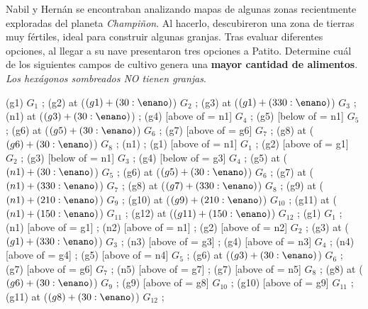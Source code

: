 \begin{probgrupal}{}{}{}

Nabil y Hernán se encontraban analizando mapas de algunas zonas recientmente exploradas del planeta \emph{Champiñon}. Al hacerlo, descubireron una zona %
de tierras muy fértiles, ideal para construir algunas granjas. Tras evaluar diferentes opciones, al llegar a su nave presentaron tres opciones a Patito. %
Determine cuál de los siguientes campos de cultivo genera una \textbf{mayor cantidad de alimentos}. \emph{Los hexágonos sombreados NO tienen granjas}.

\begin{center}
\cultivosP
\granja (g1) {$G_1$} ;
\granja (g2) at ($(g1) + (30:\enano)$) {$G_2$} ;
\granja (g3) at ($(g1) + (330:\enano)$) {$G_3$} ;
\granjaN (n1) at ($(g3) + (30:\enano)$) {} ;
\granja (g4) [above of = n1] {$G_4$} ;
\granja (g5) [below of = n1] {$G_5$} ;
\granja (g6) at ($(g5) + (30:\enano)$) {$G_6$} ;
\granja (g7) [above of = g6] {$G_7$} ;
\granja (g8) at ($(g6) + (30:\enano)$) {$G_8$} ;
\finfin
\hspace{20mm}
\cultivosP
\granjaN (n1) {} ;
\granja (g1) [above of = n1] {$G_1$} ;
\granja (g2) [above of = g1] {$G_2$} ;
\granja (g3) [below of = n1] {$G_3$} ;
\granja (g4) [below of = g3] {$G_4$} ;
\granja (g5) at ($(n1) + (30:\enano)$) {$G_5$} ;
\granja (g6) at ($(g5) + (30:\enano)$) {$G_6$} ;
\granja (g7) at ($(n1) + (330:\enano)$) {$G_7$} ;
\granja (g8) at ($(g7) + (330:\enano)$) {$G_8$} ;
\granja (g9) at ($(n1) + (210:\enano)$) {$G_9$} ;
\granja (g10) at ($(g9) + (210:\enano)$) {$G_{10}$} ;
\granja (g11) at ($(n1) + (150:\enano)$) {$G_{11}$} ;
\granja (g12) at ($(g11) + (150:\enano)$) {$G_{12}$} ;
\finfin
\hspace{20mm}
\cultivosP
\granja (g1) {$G_1$} ;
\granjaN (n1) [above of = g1] {} ;
\granjaN (n2) [above of = n1] {} ;
\granja (g2) [above of = n2] {$G_2$} ;
\granja (g3) at ($(g1) + (330:\enano)$) {$G_3$} ;
\granjaN (n3) [above of = g3] {} ;
\granja (g4) [above of = n3] {$G_4$} ;
\granjaN (n4) [above of = g4] {} ;
\granja (g5) [above of = n4] {$G_5$} ;
\granja (g6) at ($(g3) + (30:\enano)$) {$G_6$} ;
\granja (g7) [above of = g6] {$G_7$} ;
\granjaN (n5) [above of = g7] {} ;
\granja (g7) [above of = n5] {$G_8$} ;
\granja (g8) at ($(g6) + (30:\enano)$) {$G_9$} ;
\granja (g9) [above of = g8] {$G_{10}$} ;
\granja (g10) [above of = g9] {$G_{11}$} ;
\granja (g11) at ($(g8) + (30:\enano)$) {$G_{12}$} ;
\finfin
\end{center}


\end{probgrupal}


